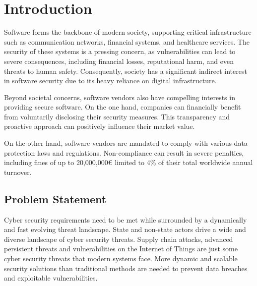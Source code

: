 \chapter{Introduction}
\label{ch:intro}
Software forms the backbone of modern society, supporting critical infrastructure such as communication networks, financial systems, and healthcare services. The security of these systems is a pressing concern, as vulnerabilities can lead to severe consequences, including financial losses, reputational harm, and even threats to human safety. Consequently, society has a significant indirect interest in software security due to its heavy reliance on digital infrastructure. \cite{Wilson_2020}

Beyond societal concerns, software vendors also have compelling interests in providing secure software. On the one hand, companies can financially benefit from voluntarily disclosing their security measures. This transparency and proactive approach can positively influence their market value. \cite{Gordon_2010}

On the other hand, software vendors are mandated to comply with various data protection laws and regulations. Non-compliance can result in severe penalties, including fines of up to 20,000,000€ limited to 4\% of their total worldwide annual turnover. \cite{GDPR}

%
%
\section{Problem Statement}
\label{sec:intro:problem_statement}
Cyber security requirements need to be met while surrounded by a dynamically and fast evolving threat landscape. State and non-state actors drive a wide and diverse landscape of cyber security threats. Supply chain attacks, advanced persistent threats and vulnerabilities on the Internet of Things are just some cyber security threats that modern systems face. \cite{Adeyeri_2024} More dynamic and scalable security solutions than traditional methods are needed to prevent data breaches and exploitable vulnerabilities. \cite{Stefinko_2024}

%
%
